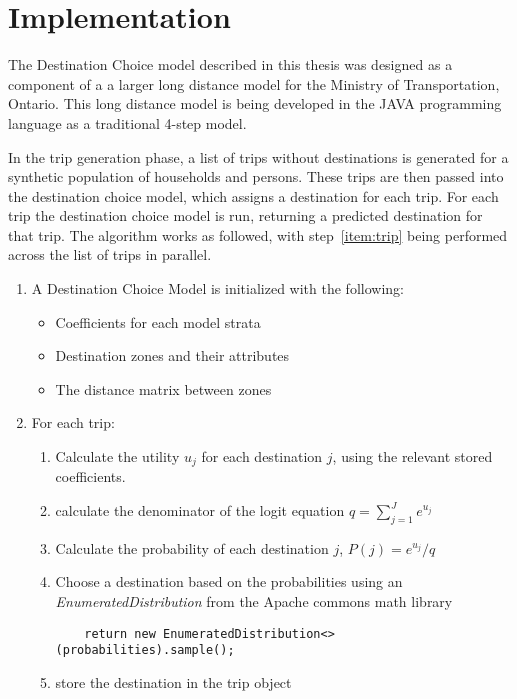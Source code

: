 \section{Implementation}
\label{section:implementation}
The Destination Choice model described in this thesis was designed as a component of a a larger long distance model for the Ministry of Transportation, Ontario. This long distance model is being developed in the JAVA programming language as a traditional 4-step model. 

In the trip generation phase, a list of trips without destinations is generated for a synthetic population of households and persons. These trips are then passed into the destination choice model, which assigns a destination for each trip. For each trip the destination choice model is run, returning a predicted destination for that trip. The algorithm works as followed, with step~\ref{item:trip} being performed across the list of trips in parallel.
\begin{enumerate}
\item A Destination Choice Model is initialized with the following:
	\begin{itemize}
	\item Coefficients for each model strata
	\item Destination zones and their attributes
	\item The distance matrix between zones
	\end{itemize}
\item \label{item:trip} For each trip:
	\begin{enumerate}
	\item Calculate the utility $u_j$ for each destination $j$, using the relevant stored coefficients.
	\item \label{item:denom} calculate the denominator of the logit equation $q = {\sum_{j=1}^{J} e^{u_j}}
	$
	\item Calculate the probability of each destination $j$, $P(j) = e^{u_j} / q $
	\item Choose a destination based on the probabilities using an \textit{EnumeratedDistribution} from the Apache commons math library 
	\begin{verbatim}
	return new EnumeratedDistribution<>(probabilities).sample();
	\end{verbatim}

	\item store the destination in the trip object
	\end{enumerate}
\end{enumerate}


